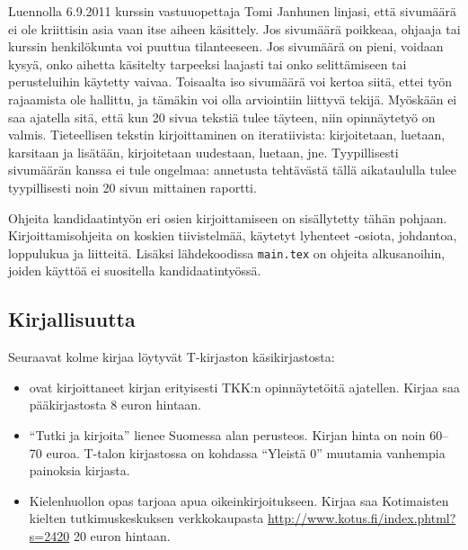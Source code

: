Luennolla 6.9.2011 kurssin vastuuopettaja Tomi Janhunen linjasi, että
sivumäärä ei ole kriittisin asia vaan itse aiheen käsittely.  Jos
sivumäärä poikkeaa, ohjaaja tai kurssin henkilökunta voi puuttua
tilanteeseen. Jos sivumäärä on pieni, voidaan kysyä, onko aihetta
käsitelty tarpeeksi laajasti tai onko selittämiseen tai perusteluihin
käytetty vaivaa. Toisaalta iso sivumäärä voi kertoa siitä, ettei työn
rajaamista ole hallittu, ja tämäkin voi olla arviointiin liittyvä
tekijä. Myöskään ei saa ajatella sitä, että kun 20 sivua tekstiä tulee
täyteen, niin opinnäytetyö on valmis. Tieteellisen tekstin
kirjoittaminen on iteratiivista: kirjoitetaan, luetaan, karsitaan ja
lisätään, kirjoitetaan uudestaan, luetaan, jne. Tyypillisesti
sivumäärän kanssa ei tule ongelmaa: annetusta tehtävästä tällä
aikataululla tulee tyypillisesti noin 20 sivun mittainen raportti.

Ohjeita kandidaatintyön eri osien kirjoittamiseen on sisällytetty
tähän pohjaan. Kirjoittamisohjeita on koskien tiivistelmää, käytetyt
lyhenteet -osiota, johdantoa, loppulukua ja liitteitä.  Lisäksi
lähdekoodissa \verb!main.tex! on ohjeita alkusanoihin, joiden käyttöä
ei suositella kandidaatintyössä.

\subsection{Kirjallisuutta}

Seuraavat kolme kirjaa löytyvät T-kirjaston käsikirjastosta:
%
\begin{itemize}
\item \cite{kauranen2006} ovat kirjoittaneet kirjan erityisesti TKK:n
  opinnäytetöitä ajatellen.  Kirjaa saa pääkirjastosta 8 euron
  hintaan.
%
\item ``Tutki ja kirjoita'' \citep{hirsjarvi2009} lienee Suomessa alan
  perusteos.  Kirjan hinta on noin 60--70 euroa.  T-talon kirjastossa
  on kohdassa ``Yleistä 0'' muutamia vanhempia painoksia kirjasta.
%
\item Kielenhuollon opas \citep{oikeinkirjoitus2010} tarjoaa apua
  oikeinkirjoitukseen. Kirjaa saa Kotimaisten kielten
  tutkimuskeskuksen verkkokaupasta
  \url{http://www.kotus.fi/index.phtml?s=2420} 20 euron hintaan.
\end{itemize}

